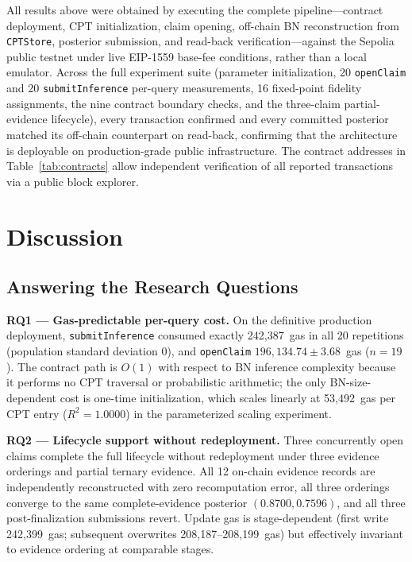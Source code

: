 \documentclass[journal]{IEEEtran}
\theoremstyle{definition}
\theoremstyle{remark}
\begin{document}
All results above were obtained by executing the complete
pipeline---contract deployment, CPT initialization, claim
opening, off-chain BN reconstruction from
\texttt{CPTStore}, posterior submission, and read-back
verification---against the Sepolia public testnet under
live EIP-1559 base-fee conditions, rather than a local
emulator. Across the full experiment suite (parameter
initialization, 20 \texttt{openClaim} and 20
\texttt{submitInference} per-query measurements, 16
fixed-point fidelity assignments, the nine contract
boundary checks, and the three-claim partial-evidence
lifecycle), every transaction confirmed and every
committed posterior matched its off-chain counterpart on
read-back, confirming
that the architecture is deployable on production-grade
public infrastructure. The contract addresses in
Table~\ref{tab:contracts} allow independent verification
of all reported transactions via a public block explorer.


\section{Discussion}
\label{sec:results-discussion}

\subsection{Answering the Research Questions}

\textbf{RQ1 --- Gas-predictable per-query cost.}
On the definitive production deployment,
\texttt{submitInference} consumed exactly
242{,}387~gas in all 20 repetitions (population standard
deviation $0$), and \texttt{openClaim}
$196{,}134.74\pm3.68$~gas ($n=19$). The contract path is
$O(1)$ with respect to BN inference complexity because it
performs no CPT traversal or probabilistic arithmetic; the
only BN-size-dependent cost is one-time initialization,
which scales linearly at 53{,}492~gas per CPT entry
($R^2=1.0000$) in the parameterized scaling experiment.

\textbf{RQ2 --- Lifecycle support without
redeployment.}
Three concurrently open claims complete the full
lifecycle without redeployment under three evidence
orderings and partial ternary evidence. All 12 on-chain
evidence records are independently reconstructed with
zero recomputation error, all three orderings converge to
the same complete-evidence posterior
$(0.8700, 0.7596)$, and all three post-finalization
submissions revert. Update gas is stage-dependent
(first write 242{,}399~gas; subsequent overwrites
208{,}187--208{,}199~gas) but effectively invariant to
evidence ordering at comparable stages.
\end{document}
